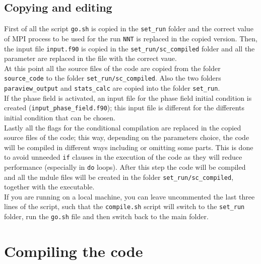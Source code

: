 \subsection{Copying and editing}
First of all the script \texttt{go.sh} is copied in the \texttt{set\_run} folder and the correct value of MPI process to be used for the run \texttt{NNT} is replaced in the copied version. Then, the input file \texttt{input.f90} is copied in the \texttt{set\_run/sc\_compiled} folder and all the parameter are replaced in the file with the correct vaue.\\
At this point all the source files of the code are copied from the folder \texttt{source\_code} to the folder \texttt{set\_run/sc\_compiled}. Also the two folders \texttt{paraview\_output} and \texttt{stats\_calc} are copied into the folder \texttt{set\_run}.\\
If the phase field is activated, an input file for the phase field initial condition is created (\texttt{input\_phase\_field.f90}); this input file is different for the differents initial condition that can be chosen.\\
Lastly all the flags for the conditional compilation are replaced in the copied source files of the code; this way, depending on the parameters choice, the code will be compiled in different ways including or omitting some parts. This is done to avoid unneeded \texttt{if} clauses in the execution of the code as they will reduce performance (especially in \texttt{do} loops). After this step the code will be compiled and all the mdule files will be created in the folder \texttt{set\_run/sc\_compiled}, together with the executable.\\
If you are running on a local machine, you can leave uncommented the last three lines of the script, such that the \texttt{compile.sh} script will switch to the \texttt{set\_run} folder, run the \texttt{go.sh} file and then switch back to the main folder.



\section{Compiling the code}

